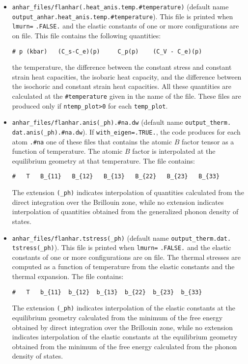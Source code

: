 \documentclass[12pt,a4paper,twoside]{report}
\begin{document}
\begin{itemize}
\item 
\texttt{anhar\_files/flanhar(.heat\_anis.temp.\#temperature)} 
(default name \\ \texttt{output\_anhar.heat\_anis.temp.\#temperature}). 
This file is printed when \texttt{lmurn=} \texttt{.FALSE.} and the elastic
constants of one or more configurations are on file.
This file contains the following quantities:
\begin{verbatim}
# p (kbar)   (C_s-C_e)(p)     C_p(p)    (C_V - C_e)(p)    
\end{verbatim}
the temperature, the difference between the constant stress and constant
strain heat capacities, the isobaric heat capacity, and the difference
between the isochoric and constant strain heat capacities. 
All these quantities are calculated at the \texttt{\#temperature} given
in the name of the file.
These files are produced only if \texttt{ntemp\_plot>0} for each
\texttt{temp\_plot}.

\item
\texttt{anhar\_files/flanhar.anis(\_ph).\#na.dw} (default name
\texttt{output\_therm.} \texttt{dat.anis(\_ph).\#na.dw}).
If \texttt{with\_eigen=.TRUE.}, the code produces for each atom 
\texttt{.\#na} one of these
files that contains the atomic $B$ factor tensor as a function of
temperature. The atomic $B$ factor is interpolated at the equilibrium
geometry at that temperature. The file contains:
\begin{verbatim}
#   T   B_{11}   B_{12}   B_{13}   B_{22}   B_{23}   B_{33}
\end{verbatim}
The extension \texttt{(\_ph)} indicates interpolation of
quantities calculated from the direct integration over the Brillouin zone,
while no extension indicates interpolation of quantities obtained
from the generalized phonon density of states.

\item
\texttt{anhar\_files/flanhar.tstress(\_ph)} (default name 
\texttt{output\_therm.dat.} \texttt{tstress(\_ph)}).
This file is printed when \texttt{lmurn=} \texttt{.FALSE.} and the 
elastic constants 
of one or more configurations are on file.
The thermal stresses are computed as a function of temperature from the
elastic constants and the thermal expansion.
The file contains:
\begin{verbatim}
#   T   b_{11}  b_{12}  b_{13}  b_{22}  b_{23}  b_{33}
\end{verbatim}
The extension \texttt{(\_ph)} indicates interpolation of
the elastic constants at the equilibrium geometry calculated from the 
minimum of the free energy obtained by direct integration over the 
Brillouin zone,
while no extension indicates interpolation of the elastic constants at
the equilibrium geometry obtained from the minimum of the free energy 
calculated from the phonon density of states.


\end{itemize}
\end{document}
